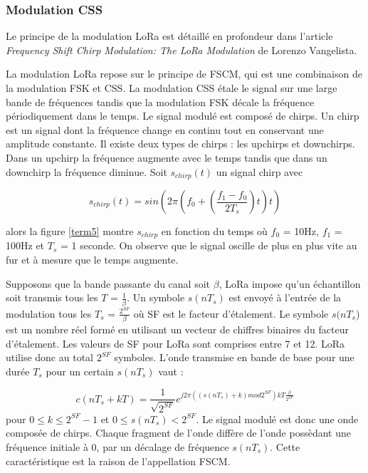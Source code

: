 \subsubsection{Modulation CSS}\label{css}

Le principe de la modulation LoRa est détaillé en profondeur dans l'article \textit{Frequency Shift Chirp Modulation: The LoRa Modulation} \cite{loraCSS} de Lorenzo Vangelista.

\vspace{0.1cm}

La modulation \ac{LoRa} repose sur le principe de \ac{FSCM}, qui est une combinaison de la modulation \ac{FSK} et \ac{CSS}.
La modulation \ac{CSS} étale le signal sur une large bande de fréquences tandis que la modulation \ac{FSK} décale la fréquence périodiquement dans le temps. Le signal modulé est composé de chirps. Un chirp est un signal dont la fréquence change en continu tout en conservant une amplitude constante. Il existe deux types de chirps : les upchirps et downchirps.
Dans un upchirp la fréquence augmente avec le temps tandis que dans un downchirp la fréquence diminue. Soit $s_{chirp}(t)$ un signal chirp avec

\begin{equation}\label{eq3}
s_{chirp}(t) = sin(2\pi(f_0 + (\frac{f_1 - f_0}{2T_s})t)t)
\end{equation}

alors la figure \ref{term5} montre $s_{chirp}$ en fonction du temps où $f_0$ = 10Hz, $f_1$ = 100Hz et $T_s$ = 1 seconde. On observe que le signal oscille de plus en plus vite au fur et à mesure que le temps augmente.

\vspace{0.1cm}

Supposons que la bande passante du canal soit $\beta$, \ac{LoRa} impose qu'un échan\-tillon soit transmis tous les $T$ = $\frac{1}{\beta}$. Un symbole $s(nT_s)$ est envoyé à l'entrée de la modulation tous les $T_s$ = $\frac{2^{SF}}{\beta}$ où \ac{SF} est le facteur d'étalement. Le symbole $s(nT_s$) est un nombre réel formé en utilisant un vecteur de chiffres binaires du facteur d'étalement. Les valeurs de \ac{SF} pour LoRa sont comprises entre 7 et 12. \ac{LoRa} utilise donc au total $2^{SF}$ symboles. L'onde transmise en bande de base pour une durée $T_s$ pour un certain $s(nT_s)$ vaut :

\begin{equation}
c(nT_s + kT) = \frac{1}{\sqrt{2^{SF}}} e^{j2\pi ((s(nT_s) +k )mod 2^{SF})kT \frac{\beta}{2^{SF}}}
\end{equation}
pour $0 \leq k \leq 2^{SF}-1$ et $0 \leq s(nT_s) < 2^{SF}$.
Le signal modulé est donc une onde composée de chirps. Chaque fragment de l'onde diffère de l'onde possèdant une fréquence initiale à 0, par un décalage de fréquence $s(nT_s)$. Cette caractéristique est la raison de l'appellation \ac{FSCM}.

